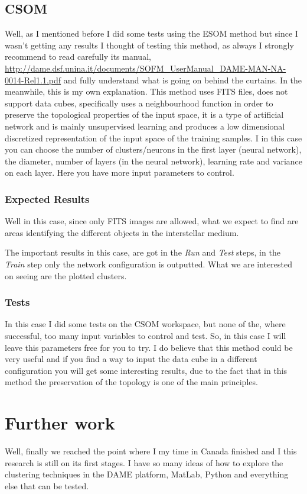 \documentclass[11pt,fleqn]{book} %
\begin{document}
\subsection{CSOM}
Well, as I mentioned before I did some tests using the ESOM method but since I wasn't getting any results I thought of testing this method, as always I strongly recommend to read carefully its manual, \url{http://dame.dsf.unina.it/documents/SOFM_UserManual_DAME-MAN-NA-0014-Rel1.1.pdf} and fully understand what is going on behind the curtains. In the meanwhile, this is my own explanation. This method uses FITS files, does not support data cubes, specifically uses a neighbourhood function in order to preserve the topological properties of the input space, it is a type of artificial network and is mainly unsupervised learning  and produces a low dimensional discretized representation of the input space of the training samples. I in this case you can choose the number of clusters/neurons in the first layer (neural network), the diameter, number of layers (in the neural network), learning rate and variance  on each layer. Here you have more input parameters to control.
\subsubsection{Expected Results}
Well in this case, since only FITS images are allowed, what we expect to find are areas identifying the different objects in the interstellar medium.

The important results in this case, are got in the \emph{Run} and \emph{Test} steps, in the \emph{Train} step only the network configuration is outputted. What we are interested on seeing are the plotted clusters.
\subsubsection{Tests}
In this case I did some tests on the CSOM workspace, but none of the, where successful, too many input variables to control and test. So, in this case I will leave this parameters free for you to try. I do believe that this method could be very useful and if you find a way to input the data cube in a different configuration you will get some interesting results, due to the fact that in this method the preservation of the topology is one of the main principles.

\section{Further work}
Well, finally we reached the point where I my time in Canada finished and I this research is still on its first stages. I have so many ideas of how to explore the clustering techniques in the DAME platform, MatLab, Python and everything else that can be tested. 
\end{document}

